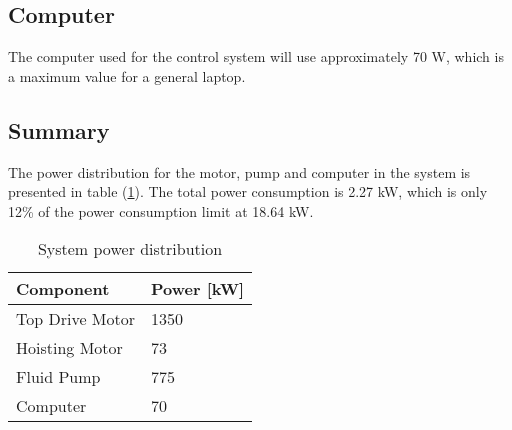 \subsection{Computer}
The computer used for the control system will use approximately 70 W, which is a maximum value for a general laptop.  

\subsection{Summary}
The power distribution for the motor, pump and computer in the system is presented in table (\ref{tab:sumpower}). The total power consumption is 2.27 kW, which is only 12\% of the power consumption limit at 18.64 kW. 

\begin{table} [H]
    \centering
    \caption{System power distribution}
    \begin{tabular}{p{3cm} p{3cm}}
        Component & Power [kW] \\ \hline \hline
        Top Drive Motor  & 1350 \\ \hline
        Hoisting Motor & 73 \\ \hline
        Fluid Pump & 775 \\ \hline
        Computer & 70 \\
    \end{tabular}
    \label{tab:sumpower}
\end{table}